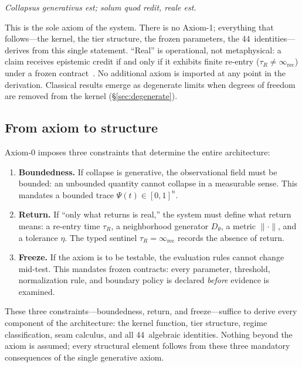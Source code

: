 \documentclass[
  aps,
  prd,
  twocolumn,
  superscriptaddress,
  nofootinbib,
  floatfix
]{revtex4-2}
\newcommand{\tR}{\tau_{\!R}}
\newcommand{\IR}{\infty_{\mathrm{rec}}}
\begin{document}
\noindent\textit{Collapsus generativus est; solum quod redit, reale
est.}

\medskip

This is the sole axiom of the system.  There is no Axiom-1;
everything that follows---the kernel, the tier structure, the
frozen parameters, the 44~identities---derives from this single
statement.  ``Real'' is operational, not metaphysical: a claim
receives epistemic credit if and only if it exhibits finite
re-entry ($\tR \neq \IR$) under a frozen
contract~\cite{paulus2025umcp}.  No additional axiom is imported
at any point in the derivation.  Classical results emerge as
degenerate limits when degrees of freedom are removed from the
kernel (\S\ref{sec:degenerate}).

\subsection{From axiom to structure}

Axiom-0 imposes three constraints that determine the
entire architecture:

\begin{enumerate}[leftmargin=*,label=(\arabic*)]
\item \textbf{Boundedness.}  If collapse is generative, the
  observational field must be bounded: an unbounded quantity cannot
  collapse in a measurable sense.  This mandates a bounded trace
  $\Psi(t) \in [0,1]^n$.

\item \textbf{Return.}  If ``only what returns is real,'' the
  system must define what return means: a re-entry time $\tR$, a
  neighborhood generator $D_\theta$, a metric $\|\cdot\|$, and a
  tolerance $\eta$.  The typed sentinel $\tR = \IR$ records
  the absence of return.

\item \textbf{Freeze.}  If the axiom is to be testable, the
  evaluation rules cannot change mid-test.  This mandates frozen
  contracts: every parameter, threshold, normalization rule, and
  boundary policy is declared \emph{before} evidence is examined.
\end{enumerate}

These three constraints---boundedness, return, and freeze---suffice
to derive every component of the architecture: the kernel function,
tier structure, regime classification, seam calculus, and all
44~algebraic identities.  Nothing beyond the axiom is assumed;
every structural element follows from these three mandatory
consequences of the single generative axiom.
\end{document}
